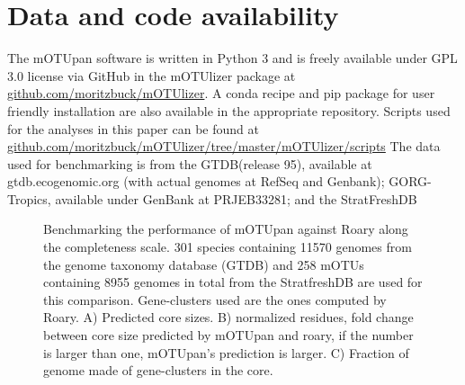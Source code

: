 \documentclass{article}
\begin{document}
\section*{Data and code availability}
The mOTUpan software is written in Python 3 and is freely available under GPL 3.0 license via GitHub in the mOTUlizer package at \href{github.com/moritzbuck/mOTUlizer}{github.com/moritzbuck/mOTUlizer}. A conda recipe and pip package for user friendly installation are also available in the appropriate repository. Scripts used for the analyses in this paper can be found at \href{github.com/moritzbuck/mOTUlizer/tree/master/mOTUlizer/scripts}{github.com/moritzbuck/mOTUlizer/tree/master/mOTUlizer/scripts}
The data used for benchmarking is from the GTDB\citep{parks_2020}(release 95), available at gtdb.ecogenomic.org (with actual genomes at RefSeq and Genbank); GORG-Tropics\cite{pachiadaki_2019}, available under GenBank at PRJEB33281; and the StratFreshDB\citep{buck_2021a}




\begin{figure}
	\caption[mOTUpan vs. roary]
	{	\label{fig:roary}Benchmarking the performance of mOTUpan against Roary along the completeness scale. 301 species containing 11570 genomes from the genome taxonomy database (GTDB) and 258 mOTUs containing 8955 genomes in total from the StratfreshDB are used for this comparison. Gene-clusters used are the ones computed by Roary. A) Predicted core sizes. B) normalized residues, fold change between core size predicted by mOTUpan and roary, if the number is larger than one, mOTUpan’s prediction is larger. C) Fraction of genome made of gene-clusters in the core.}
\end{figure}
\end{document}

